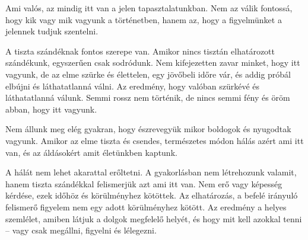 Ami valós, az mindig itt van a jelen tapasztalatunkban. Nem az válik
fontossá, hogy kik vagy mik vagyunk a történetben, hanem az, hogy a
figyelmünket a jelennek tudjuk szentelni.

\enlargethispage*{\baselineskip}

A tiszta szándéknak fontos szerepe van. Amikor nincs tisztán
elhatározott szándékunk, egyszerűen csak sodródunk. Nem kifejezetten
zavar minket, hogy itt vagyunk, de az elme szürke és élettelen, egy
jövőbeli időre vár, és addig próbál elbújni és láthatatlanná válni. Az
eredmény, hogy valóban szürkévé és láthatatlanná válunk. Semmi rossz nem
történik, de nincs semmi fény és öröm abban, hogy itt vagyunk.

Nem állunk meg elég gyakran, hogy észrevegyük mikor boldogok és
nyugodtak vagyunk. Amikor az elme tiszta és csendes, természetes módon
hálás azért ami itt van, és az áldásokért amit életünkben kaptunk.

A hálát nem lehet akarattal erőltetni. A gyakorlásban nem létrehozunk
valamit, hanem tiszta szándékkal felismerjük azt ami itt van. Nem erő
vagy képesség kérdése, ezek időhöz és körülményhez kötöttek. Az
elhatározás, a befelé irányuló felismerő figyelem nem egy adott
körülményhez kötött. Az eredmény a helyes szemlélet, amiben látjuk a
dolgok megfelelő helyét, és hogy mit kell azokkal tenni -- vagy csak
megállni, figyelni és lélegezni.

